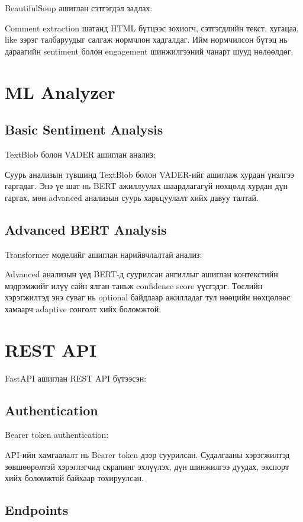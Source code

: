 \documentclass[12pt,a4paper]{report}
\begin{document}
BeautifulSoup ашиглан сэтгэгдэл задлах:

Comment extraction шатанд HTML бүтцээс зохиогч, сэтгэгдлийн текст, хугацаа, like зэрэг талбаруудыг салгаж нормчлон хадгалдаг. Ийм нормчилсон бүтэц нь дараагийн sentiment болон engagement шинжилгээний чанарт шууд нөлөөлдөг.


\section{ML Analyzer}

\subsection{Basic Sentiment Analysis}

TextBlob болон VADER ашиглан анализ:

Суурь анализын түвшинд TextBlob болон VADER-ийг ашиглаж хурдан үнэлгээ гаргадаг. Энэ үе шат нь BERT ажиллуулах шаардлагагүй нөхцөлд хурдан дүн гаргах, мөн advanced анализын суурь харьцуулалт хийх давуу талтай.


\subsection{Advanced BERT Analysis}

Transformer моделийг ашиглан нарийвчлалтай анализ:

Advanced анализын үед BERT-д суурилсан ангиллыг ашиглан контекстийн мэдрэмжийг илүү сайн ялган таньж confidence score үүсгэдэг. Төслийн хэрэгжилтэд энэ суваг нь optional байдлаар ажилладаг тул нөөцийн нөхцөлөөс хамаарч adaptive сонголт хийх боломжтой.


\section{REST API}

FastAPI ашиглан REST API бүтээсэн:

\subsection{Authentication}

Bearer token authentication:

API-ийн хамгаалалт нь Bearer token дээр суурилсан. Судалгааны хэрэгжилтэд зөвшөөрөлтэй хэрэглэгчид скрапинг эхлүүлэх, дүн шинжилгээ дуудах, экспорт хийх боломжтой байхаар тохируулсан.


\subsection{Endpoints}
\end{document}
